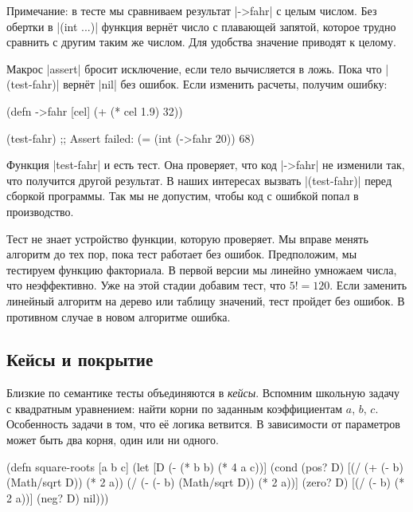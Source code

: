 Примечание: в тесте мы сравниваем результат \spverb|->fahr| с целым числом. Без
обертки в \spverb|(int ...)| функция верн\"{е}т число с плавающей запятой, которое
трудно сравнить с другим таким же числом. Для удобства значение приводят к
целому.

Макрос \spverb|assert| бросит исключение, если тело вычисляется в ложь. Пока что
\spverb|(test-fahr)| верн\"{е}т \spverb|nil| без ошибок. Если изменить расчеты,
получим ошибку:

\begin{english}
  \begin{clojure}
(defn ->fahr [cel]
  (+ (* cel 1.9) 32))

(test-fahr)
;; Assert failed: (= (int (->fahr 20)) 68)
  \end{clojure}
\end{english}

Функция \spverb|test-fahr| и есть тест. Она проверяет, что код \spverb|->fahr|
не изменили так, что получится другой результат. В наших интересах вызвать
\spverb|(test-fahr)| перед сборкой программы. Так мы не допустим, чтобы код с
ошибкой попал в производство.


Тест не знает устройство функции, которую проверяет. Мы вправе менять алгоритм
до тех пор, пока тест работает без ошибок. Предположим, мы тестируем функцию
факториала. В первой версии мы линейно умножаем числа, что неэффективно. Уже на
этой стадии добавим тест, что $5! = 120$. Если заменить линейный алгоритм на
дерево или таблицу значений, тест пройдет без ошибок. В противном случае в новом
алгоритме ошибка.

\subsection{Кейсы и покрытие}


Близкие по семантике тесты объединяются в \emph{кейсы}. Вспомним школьную задачу
с квадратным уравнением: найти корни по заданным коэффициентам $a$, $b$,
$c$. Особенность задачи в том, что е\"{е} логика ветвится. В зависимости от
параметров может быть два корня, один или ни одного.


\begin{english}
  \begin{clojure}
(defn square-roots [a b c]
  (let [D (- (* b b) (* 4 a c))]
    (cond
      (pos? D) [(/ (+ (- b) (Math/sqrt D)) (* 2 a))
                (/ (- (- b) (Math/sqrt D)) (* 2 a))]
      (zero? D) [(/ (- b) (* 2 a))]
      (neg? D) nil)))
  \end{clojure}
\end{english}


